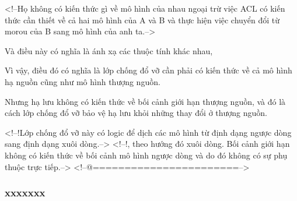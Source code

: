 \documentclass{article} %
\begin{document}
<!--Họ không có kiến ​​thức gì về mô hình của nhau ngoại trừ việc ACL có kiến ​​thức cần thiết về cả hai mô hình của A và B và thực hiện việc chuyển đổi từ morou của B sang mô hình của anh ta.-->

Và điều này có nghĩa là ánh xạ các thuộc tính khác nhau,

Vì vậy, điều đó có nghĩa là lớp chống đổ vỡ cần phải có kiến ​​thức về cả mô hình hạ nguồn cũng như mô hình thượng nguồn.

Nhưng hạ lưu không có kiến ​​thức về bối cảnh giới hạn thượng nguồn, và đó là cách lớp chống đổ vỡ bảo vệ hạ lưu khỏi những thay đổi ở thượng nguồn.

<!--!Lớp chống đổ vỡ này có logic để dịch các mô hình từ định dạng ngược dòng sang định dạng xuôi dòng.-->
<!--!, theo hướng đó xuôi dòng. Bối cảnh giới hạn không có kiến ​​thức về bối cảnh mô hình ngược dòng và do đó không có sự phụ thuộc trực tiếp.-->
<!--@=======================-->
%
%
 


\subsubsection{xxxxxxx}
% 
\end{document}
